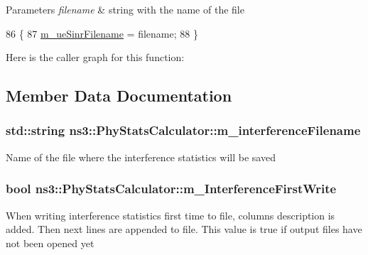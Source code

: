\begin{DoxyParams}{Parameters}
{\em filename} & string with the name of the file \\
\hline
\end{DoxyParams}

\begin{DoxyCode}
86 \{
87   \hyperlink{classns3_1_1PhyStatsCalculator_a5388808a7e5faeb47c716c85ce8183fd}{m\_ueSinrFilename} = filename;
88 \}
\end{DoxyCode}


Here is the caller graph for this function\+:




\subsection{Member Data Documentation}
\subsubsection[{\texorpdfstring{m\+\_\+interference\+Filename}{m_interferenceFilename}}]{\setlength{\rightskip}{0pt plus 5cm}std\+::string ns3\+::\+Phy\+Stats\+Calculator\+::m\+\_\+interference\+Filename\hspace{0.3cm}{\ttfamily [private]}}\hypertarget{classns3_1_1PhyStatsCalculator_a48d0dac94f8e067b63c06efed42a7429}{}\label{classns3_1_1PhyStatsCalculator_a48d0dac94f8e067b63c06efed42a7429}
Name of the file where the interference statistics will be saved 
\subsubsection[{\texorpdfstring{m\+\_\+\+Interference\+First\+Write}{m_InterferenceFirstWrite}}]{\setlength{\rightskip}{0pt plus 5cm}bool ns3\+::\+Phy\+Stats\+Calculator\+::m\+\_\+\+Interference\+First\+Write\hspace{0.3cm}{\ttfamily [private]}}\hypertarget{classns3_1_1PhyStatsCalculator_a0b10c7dc6562ef4dbb3e06448420bb33}{}\label{classns3_1_1PhyStatsCalculator_a0b10c7dc6562ef4dbb3e06448420bb33}
When writing interference statistics first time to file, columns description is added. Then next lines are appended to file. This value is true if output files have not been opened yet 
